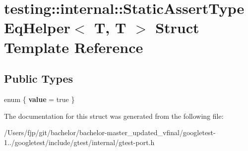 \hypertarget{structtesting_1_1internal_1_1_static_assert_type_eq_helper_3_01_t_00_01_t_01_4}{}\section{testing\+:\+:internal\+:\+:Static\+Assert\+Type\+Eq\+Helper$<$ T, T $>$ Struct Template Reference}
\label{structtesting_1_1internal_1_1_static_assert_type_eq_helper_3_01_t_00_01_t_01_4}
\subsection*{Public Types}
\begin{DoxyCompactItemize}
\item 
\mbox{\label{structtesting_1_1internal_1_1_static_assert_type_eq_helper_3_01_t_00_01_t_01_4_acdb69a9c4164628ea6a80bd6442058c6}} 
enum \{ {\bfseries value} = true
 \}
\end{DoxyCompactItemize}


The documentation for this struct was generated from the following file\+:\begin{DoxyCompactItemize}
\item 
/\+Users/fjp/git/bachelor/bachelor-\/master\+\_\+updated\+\_\+vfinal/googletest-\/1../googletest/include/gtest/internal/gtest-\/port.\+h\end{DoxyCompactItemize}
